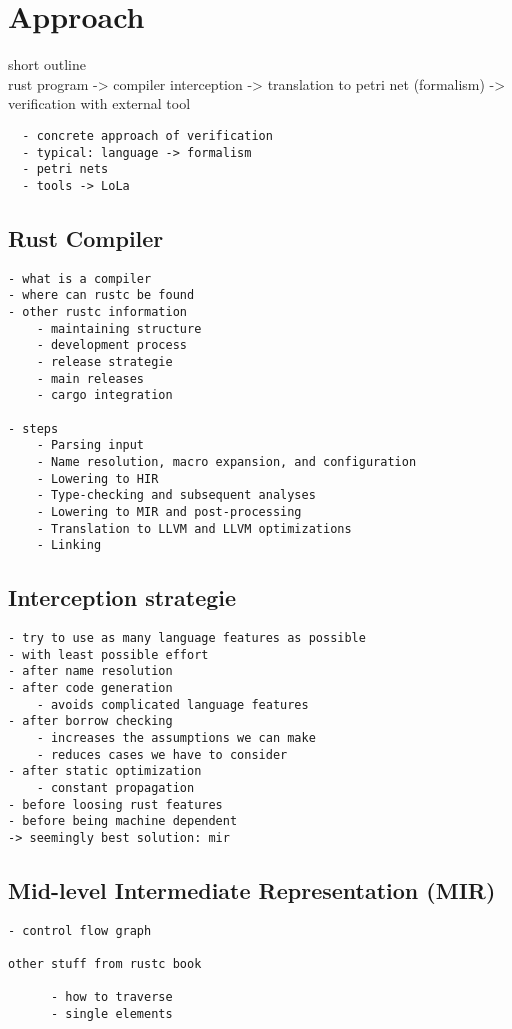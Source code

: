 

\chapter{Approach}
short outline\\
rust program -> compiler interception -> translation to petri net (formalism) -> verification with external tool
\begin{verbatim}
  - concrete approach of verification
  - typical: language -> formalism
  - petri nets
  - tools -> LoLa
\end{verbatim}

\section{Rust Compiler}
\label{app_rust}
\begin{verbatim}
- what is a compiler
- where can rustc be found
- other rustc information
    - maintaining structure
    - development process
    - release strategie
    - main releases
    - cargo integration

- steps
    - Parsing input 
    - Name resolution, macro expansion, and configuration
    - Lowering to HIR
    - Type-checking and subsequent analyses
    - Lowering to MIR and post-processing
    - Translation to LLVM and LLVM optimizations
    - Linking
\end{verbatim}

\section{Interception strategie}
\label{app_intercept}
\begin{verbatim}
- try to use as many language features as possible
- with least possible effort
- after name resolution
- after code generation
    - avoids complicated language features
- after borrow checking
    - increases the assumptions we can make
    - reduces cases we have to consider
- after static optimization
    - constant propagation
- before loosing rust features
- before being machine dependent
-> seemingly best solution: mir
\end{verbatim}

\section{Mid-level Intermediate Representation (MIR)}
\label{app_mir}
\begin{verbatim}
- control flow graph

other stuff from rustc book

      - how to traverse
      - single elements
\end{verbatim}


